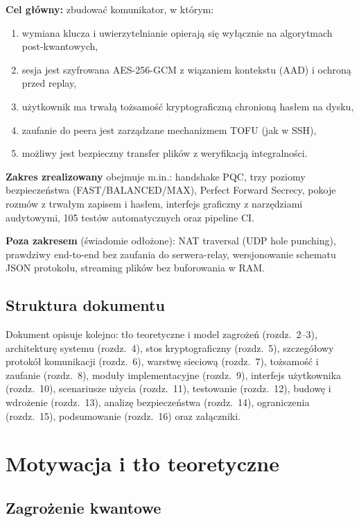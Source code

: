 \documentclass[12pt,a4paper]{article}
\begin{document}
\textbf{Cel główny:} zbudować komunikator, w którym:
\begin{enumerate}[label=\alph*)]
    \item wymiana klucza i uwierzytelnianie opierają się wyłącznie na algorytmach post-kwantowych,
    \item sesja jest szyfrowana AES-256-GCM z wiązaniem kontekstu (AAD) i ochroną przed replay,
    \item użytkownik ma trwałą tożsamość kryptograficzną chronioną hasłem na dysku,
    \item zaufanie do peera jest zarządzane mechanizmem TOFU (jak w SSH),
    \item możliwy jest bezpieczny transfer plików z weryfikacją integralności.
\end{enumerate}

\textbf{Zakres zrealizowany} obejmuje m.in.: handshake PQC, trzy poziomy bezpieczeństwa (FAST/BALANCED/MAX), Perfect Forward Secrecy, pokoje rozmów z trwałym zapisem i hasłem, interfejs graficzny z narzędziami audytowymi, 105 testów automatycznych oraz pipeline CI.

\textbf{Poza zakresem} (świadomie odłożone): NAT traversal (UDP hole punching), prawdziwy end-to-end bez zaufania do serwera-relay, wersjonowanie schematu JSON protokołu, streaming plików bez buforowania w RAM.

\subsection{Struktura dokumentu}

Dokument opisuje kolejno: tło teoretyczne i model zagrożeń (rozdz.~2--3), architekturę systemu (rozdz.~4), stos kryptograficzny (rozdz.~5), szczegółowy protokół komunikacji (rozdz.~6), warstwę sieciową (rozdz.~7), tożsamość i zaufanie (rozdz.~8), moduły implementacyjne (rozdz.~9), interfejs użytkownika (rozdz.~10), scenariusze użycia (rozdz.~11), testowanie (rozdz.~12), budowę i wdrożenie (rozdz.~13), analizę bezpieczeństwa (rozdz.~14), ograniczenia (rozdz.~15), podsumowanie (rozdz.~16) oraz załączniki.

\section{Motywacja i tło teoretyczne}

\subsection{Zagrożenie kwantowe}
\end{document}
